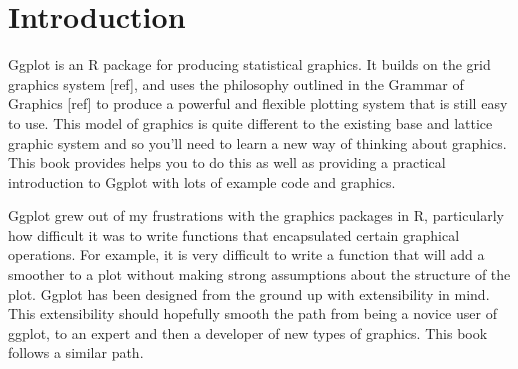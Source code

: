 


\chapter{Introduction}

Ggplot is an R package for producing statistical graphics.  It builds on the grid graphics system [ref], and uses the philosophy outlined in the Grammar of Graphics [ref] to produce a powerful and flexible plotting system that is still easy to use.  This model of graphics is quite different to the existing base and lattice graphic system and so you'll need to learn a new way of thinking about graphics.  This book provides helps you to do this as well as providing a practical introduction to Ggplot with lots of example code and graphics.

Ggplot grew out of my frustrations with the graphics packages in R, particularly how difficult it was to write functions that encapsulated certain graphical operations.  For example, it is very difficult to write a function that will add a smoother to a plot without making strong assumptions about the structure of the plot.  Ggplot has been designed from the ground up with extensibility in mind.  This extensibility should hopefully smooth the path from being a novice user of ggplot, to an expert and then a developer of new types of graphics.  This book follows a similar path. 


